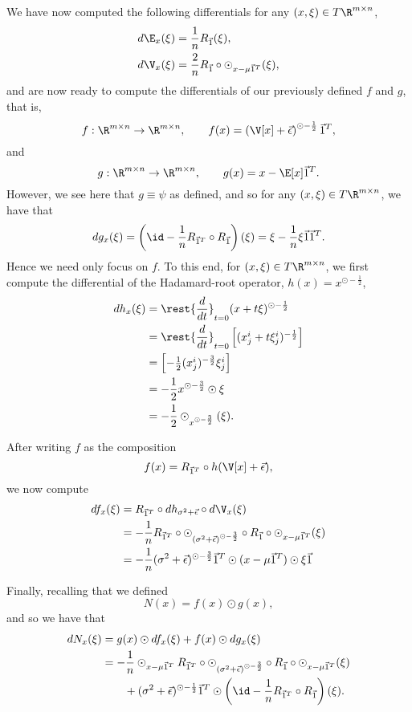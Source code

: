 We have now computed the following differentials for any $(x,\xi)\in T\R^{m\times n}$,
\begin{align*}
	d\E_x(\xi)&=\frac{1}{n}R_{\vec{1}}(\xi),\\
	d\V_x(\xi)&=\frac{2}{n}R_{\vec{1}}\circ\odot_{x-\mu\vec{1}^T}(\xi),
\end{align*}
and are now ready to compute the differentials of our previously defined $f$ and $g$, that is,
$$f:\R^{m\times n}\to\R^{m\times n},\qquad f(x)=\left(\V[x]+\vec{\epsilon}\right)^{\odot-\frac{1}{2}}\vec{1}^T,$$
and
$$g:\R^{m\times n}\to\R^{m\times n},\qquad g(x)=x-\E[x]\vec{1}^T.$$
However, we see here that $g\equiv\psi$ as defined, and so for any $(x,\xi)\in T\R^{m\times n}$, we have that
$$dg_x(\xi)=\left(\id-\frac{1}{n}R_{\vec{1}^T}\circ R_{\vec{1}}\right)(\xi)=\xi-\frac{1}{n}\xi\vec{1}\vec{1}^T.$$
Hence we need only focus on $f$.  To this end, for $(x,\xi)\in T\R^{m\times n}$, we first compute the differential of the Hadamard-root operator, $h(x)=x^{\odot-\frac{1}{2}}$,
\begin{align*}
	dh_x(\xi)&=\rest{\frac{d}{dt}}_{t=0}(x+t\xi)^{\odot-\frac{1}{2}}\\
	&=\rest{\frac{d}{dt}}_{t=0}\begin{bmatrix}
		(x^i_j+t\xi^i_j)^{-\frac{1}{2}}
	\end{bmatrix}\\
	&=\begin{bmatrix}
		-\frac{1}{2}(x^i_j)^{-\frac{3}{2}}\xi^i_j
	\end{bmatrix}\\
	&=-\frac{1}{2}x^{\odot-\frac{3}{2}}\odot\xi\\
	&=-\frac{1}{2}\odot_{x^{\odot-\frac{3}{2}}}(\xi).
\end{align*}

After writing $f$ as the composition
$$f(x)=R_{\vec{1}^T}\circ h(\V[x]+\vec{\epsilon}),$$
we now compute
\begin{align*}
	df_x(\xi)&=R_{\vec{1}^T}\circ dh_{\sigma^2+\vec{\epsilon}}\circ d\V_x(\xi)\\
	&=-\frac{1}{n}R_{\vec{1}^T}\circ\odot_{(\sigma^2+\vec{\epsilon})^{\odot-\frac{3}{2}}}\circ R_{\vec{1}}\circ\odot_{x-\mu\vec{1}^T}(\xi)\\
	&=-\frac{1}{n}(\sigma^2+\vec{\epsilon})^{\odot-\frac{3}{2}}\vec{1}^T\odot(x-\mu\vec{1}^T)\odot\xi\vec{1}
\end{align*}

Finally, recalling that we defined
$$N(x)=f(x)\odot g(x),$$
and so we have that
\begin{align*}
	dN_x(\xi)&=g(x)\odot df_x(\xi)+f(x)\odot dg_x(\xi)\\
	&=-\frac{1}{n}\odot_{x-\mu\vec{1}^T}R_{\vec{1}^T}\circ\odot_{(\sigma^2+\vec{\epsilon})^{\odot-\frac{3}{2}}}\circ R_{\vec{1}}\circ\odot_{x-\mu\vec{1}^T}(\xi)\\
	&\qquad +(\sigma^2+\vec{\epsilon})^{\odot-\frac{1}{2}}\vec{1}^T\odot \left(\id-\frac{1}{n}R_{\vec{1}^T}\circ R_{\vec{1}}\right)(\xi).
\end{align*}


